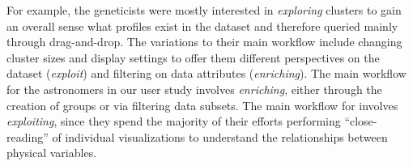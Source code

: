 \par  For example, the geneticists were mostly interested in \textit{exploring} clusters to gain an overall sense what profiles exist in the dataset  and therefore queried mainly through drag-and-drop. The variations to their main workflow include changing cluster sizes and display settings to offer them different perspectives on the dataset (\textit{exploit}) and filtering on data attributes (\textit{enriching}). 
The main workflow for the astronomers in our user study involves \textit{enriching}, either through the creation of groups or via filtering data subsets. The main workflow for \matsci involves \textit{exploiting}, since they spend the majority of their efforts performing ``close-reading'' of individual visualizations to understand the relationships between  physical variables. %
